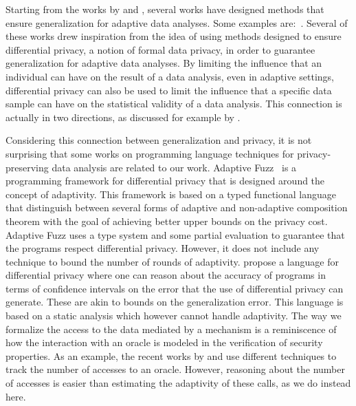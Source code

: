 Starting from the works by \citet{DworkFHPRR15} and \citet{HardtU14}, several works have designed methods that ensure generalization for adaptive data analyses.
Some examples
are:~\cite{dwork2015reusable,dwork2015generalization,
BassilyNSSSU16,UllmanSNSS18,FeldmanS17,jung2019new,SteinkeZ20,RogersRSSTW20}.
Several of these works drew inspiration from the idea of using methods designed to ensure differential privacy, a notion of formal data privacy, in order to guarantee generalization for adaptive data analyses.
By limiting the influence that an individual can have on the result of a data analysis, even in adaptive settings, differential privacy can also be used to limit the influence that a specific data sample can have on the statistical validity of a data analysis.
This connection is actually in two directions, as discussed for example by \citet{YeomGFJ18}.

Considering this connection between generalization and privacy, it is not surprising
that some works on programming language techniques for privacy-preserving data analysis are related to our work. 
Adaptive Fuzz~\cite{Winograd-CortHR17} is a programming framework for differential privacy that is designed around the concept of adaptivity. 
This framework is based on a typed functional language that distinguish between several forms of adaptive and non-adaptive composition theorem with the goal of achieving better upper bounds on the privacy cost.
Adaptive Fuzz uses a type system and some partial evaluation to guarantee that the programs respect differential privacy.
However, it does not include any technique to bound the number of rounds of adaptivity. 
\citet{lobo2021programming} propose a language for differential privacy where one can reason about the accuracy of programs in terms of confidence intervals on the error that the use of differential privacy can generate. These are akin to bounds on the generalization error. This language is based on a static analysis which however cannot handle adaptivity. 
%
The way we formalize the access to the data mediated by a mechanism is a reminiscence of how the interaction with an oracle is modeled in the verification of security properties. As an example, the recent works by \citet{BarbosaBGKS21} and \citet{AguirreBGGKS21} use different techniques to track the number of accesses to an oracle. However, reasoning about the number of accesses is easier than estimating the adaptivity of these calls, as we do instead here.
